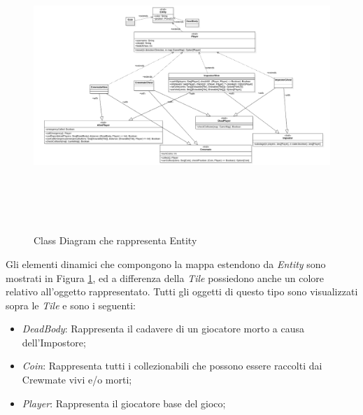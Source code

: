 \begin{figure}[ht]
\centering
\includegraphics[width=13cm, height=11cm]{doc/report/img/ClassCore.png}
\caption{Class Diagram che rappresenta Entity}
\label{fig:ClasDiagRaprEnt}
\end{figure}

Gli elementi dinamici che compongono la mappa estendono da \textit{Entity} sono mostrati in Figura \ref{fig:ClasDiagRaprEnt}, ed a differenza della \textit{Tile} possiedono anche un colore relativo all'oggetto rappresentato. Tutti gli oggetti di questo tipo sono visualizzati sopra le \textit{Tile} e sono i seguenti:
\begin{itemize}
    \item \textit{DeadBody}: Rappresenta il cadavere di un giocatore morto a causa dell'Impostore;
    \item \textit{Coin}: Rappresenta tutti i collezionabili che possono essere raccolti dai Crewmate vivi e/o morti;
    \item \textit{Player}: Rappresenta il giocatore base del gioco;
\end{itemize}

